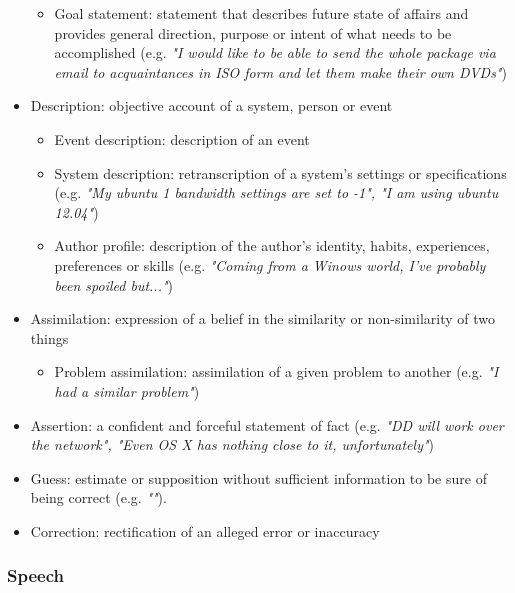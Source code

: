 \documentclass[11pt]{article}
\begin{document}
\begin{itemize}
\begin{itemize}
			\item Goal statement: statement that describes future state of affairs and provides general direction, purpose or intent of what needs to be accomplished (e.g. \textit{"I would like to be able to send the whole package via email to acquaintances in ISO form and let them make their own DVDs"})
		\end{itemize}
	\item Description: objective account of a system, person or event
		\begin{itemize}
			\item Event description: description of an event
			\item System description: retranscription of a system's settings or specifications (e.g. \textit{"My ubuntu 1 bandwidth settings are set to -1", "I am using ubuntu 12.04"})
			\item Author profile: description of the author's identity, habits, experiences, preferences or skills (e.g. \textit{"Coming from a Winows world, I've probably been spoiled but..."})
		\end{itemize}
	\item Assimilation: expression of a belief in the similarity or non-similarity of two things
		\begin{itemize}
			\item Problem assimilation: assimilation of a given problem to another (e.g. \textit{"I had a similar problem"})
		\end{itemize}
	\item Assertion: a confident and forceful statement of fact (e.g. \textit{"DD will work over the network", "Even OS X has nothing close to it, unfortunately"})
	\item Guess: estimate or supposition without sufficient information to be sure of being correct (e.g. \textit{""}).
	\item Correction: rectification of an alleged error or inaccuracy
\end{itemize}

\subsubsection{Speech}
\end{document}
